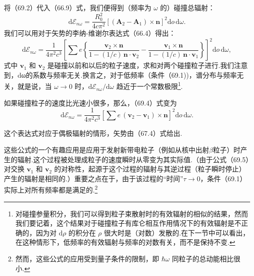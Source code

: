 将（69.2）代入（66.9）式，我们便得到（频率为 $\omega$ 的）碰撞总辐射：
\begin{equation}
  \mathrm{d}\mathcal{E}_{n\omega}=\frac{R_0^2}{4c\pi^2}\left[(\boldsymbol{A}_2-\boldsymbol{A}_1)\times\boldsymbol{n}\right]^2\mathrm{d}o\,\mathrm{d}\omega.
\end{equation}
我们可以用对于矢势的李纳-维谢尔表达式（66.4）得出：
\begin{equation}
  \mathrm{d}\mathcal{E}_{n\omega}=\frac{1}{4\pi^2c^3}\left[\sum e\left\{\frac{\boldsymbol{v}_2\times\boldsymbol{n}}{1-(1/c)\,\boldsymbol{n}\cdot\boldsymbol{v}_2}-\frac{\boldsymbol{v}_1\times\boldsymbol{n}}{1-(1/c)\,\boldsymbol{n}\cdot\boldsymbol{v}_1}\right\}\right]^2\mathrm{d}o\,\mathrm{d}\omega,
\end{equation}
式中 $\boldsymbol{v}_1$ 和 $\boldsymbol{v}_2$ 是碰撞以前和以后的粒子速度，求和对两个碰撞粒子进行.我们注意到，dω的系数与频率无关.换言之，对于低频率（条件（69.1))，谱分布与频率无关，就是说，当 $\omega\to0$ 时，$\mathrm{d}\mathcal{E}_{n\omega}/\mathrm{d}\omega$ 趋近于一个常数极限\footnote{对碰撞参量积分，我们可以得到粒子束散射时的有效辐射的相似的结果，然而我们要记着，这个结果对于碰撞粒子有库仑相互作用情况下的有效辐射是不正确的，因为对 $\mathrm{d}\rho$ 的积分在 $\rho$ 很大时是（对数）发散的.在下一节中可以看出，在这种情形下，低频率的有效辐射与频率的对数有关，而不是保持不变.}.

如果碰撞粒子的速度比光速小很多，那么，（69.4）式变为
\begin{equation}
  \mathrm{d}\mathcal{E}_{n\omega}=\frac{1}{4\pi^2c^3}\left[\sum e\,(\boldsymbol{v}_2-\boldsymbol{v}_1)\times\boldsymbol{n}\right]^2\mathrm{d}o\,\mathrm{d}\omega.
\end{equation}

这个表达式对应于偶极辐射的情形，矢势由（67.4）式给出.

这些公式的一个有趣应用是应用于发射新带电粒子（例如从核中出射$\beta$粒子）时产生的辐射.这个过程被处理成粒子的速度瞬时从零变为其实际值.（由于公式（69.5）对交换 $\boldsymbol{v}_1$ 和 $\boldsymbol{v}_2$ 的对称性，起源于这个过程的辐射与其逆过程（粒子瞬时停止）产生的辐射是相同的.）重要之点在于，由于该过程的“时间”$\tau\to0$，条件（69.1）实际上对所有频率都是满足的.\footnote{然而，这些公式的应用受到量子条件的限制，即 $\hbar\omega$ 同粒子的总动能相比很小.}

